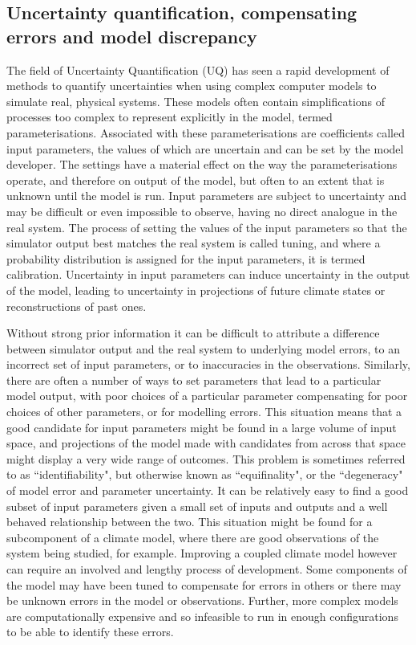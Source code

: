 \documentclass[gmd, manuscript]{copernicus}
\begin{document}


\introduction  %
\subsection{Uncertainty quantification, compensating errors and model discrepancy}

The field of Uncertainty Quantification (UQ) has seen a rapid development of methods to quantify uncertainties when using complex computer models to simulate real, physical systems. These models often contain simplifications of processes too complex to represent explicitly in the model, termed parameterisations. Associated with these parameterisations are coefficients called input parameters, the values of which are uncertain and can be set by the model developer. The settings have a material effect on the way the parameterisations operate, and therefore on output of the model, but often to an extent that is unknown until the model is run. Input parameters are subject to uncertainty and may be difficult or even impossible to observe, having no direct analogue in the real system. The process of setting the values of the input parameters so that the simulator output best matches the real system is called tuning, and where a probability distribution is assigned for the input parameters, it is termed calibration. Uncertainty in input parameters can induce uncertainty in the output of the model, leading to uncertainty in projections of future climate states or reconstructions of past ones.

Without strong prior information it can be difficult to attribute a difference between simulator output and the real system to underlying model errors, to an incorrect set of input parameters, or to inaccuracies in the observations. Similarly, there are often a number of ways to set parameters that lead to a particular model output, with poor choices of a particular parameter compensating for poor choices of other parameters, or for modelling errors. This situation means that a good candidate for input parameters might be found in a large volume of input space, and projections of the model made with candidates from across that space might display a very wide range of outcomes. This problem is sometimes referred to as ``identifiability", but otherwise known as ``equifinality", or the ``degeneracy" of model error and parameter uncertainty. It can be relatively easy to find a good subset of input parameters given a small set of inputs and outputs and a well behaved relationship between the two. This situation might be found for a subcomponent of a climate model, where there are good observations of the system being studied, for example. Improving a coupled climate model however can require an involved and lengthy process of development. Some components of the model may have been tuned to compensate for errors in others or there may be unknown errors in the model or observations. Further, more complex models are computationally expensive and so infeasible to run in enough configurations to be able to identify these errors.
\end{document}

